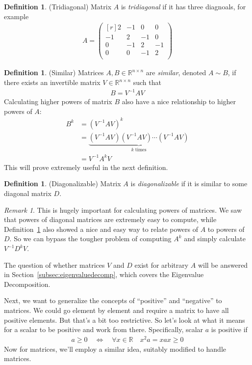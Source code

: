 \documentclass[12pt]{article}
\numberwithin{equation}{section} %
\theoremstyle{plain}
\theoremstyle{definition}
\newtheorem{defn}[thm]{Definition}
\theoremstyle{remark}
\newtheorem*{rmk}{Remark}
\newcommand{\R}{\mathbb{R}}
\newcommand{\Rnn}{\mathbb{R}^{n\times n}}
\begin{document}
\begin{defn}{(Tridiagonal)}
Matrix $A$ is \emph{tridiagonal} if it has three diagnoals, for example
\begin{align*}
  A =
  \begin{pmatrix}[r]
   2 & -1 &  0 &  0 \\
  -1 & 2 & -1 &  0 \\
   0 & -1 &  2 & -1 \\
   0 &  0 & -1 &  2 \\
  \end{pmatrix}
\end{align*}
\end{defn}

\begin{defn}{(Similar)}
\label{defn:similar}
Matrices $A,B \in \Rnn$ are \emph{similar}, denoted $A\sim B$, if there
exists an invertible matrix $V\in \Rnn$ such that
\begin{align*}
  B = V^{-1} A V
\end{align*}
Calculating higher powers of matrix $B$ also have a nice relationship to
higher powers of $A$:
\begin{align*}
  B^k &= \left(V^{-1} A V\right)^k \\
      &= \underbrace{\left(V^{-1} A V\right)\left(V^{-1} A V\right)
      \cdots  \left(V^{-1} A V\right)}_{k \;\text{times}} \\
      &= V^{-1} A^k V
\end{align*}
This will prove extremely useful in the next definition.
\end{defn}

\begin{defn}{(Diagonalizable)}
Matrix $A$ is \emph{diagonalizable} if it is similar to some diagonal
matrix $D$.
\end{defn}
\begin{rmk}
This is hugely important for calculating powers of matrices. We saw that
powers of diagonal matrices are extremely easy to compute, while
Definition~\ref{defn:similar} also showed a nice and easy way to relate
powers of $A$ to powers of $D$. So we can bypass the tougher problem of
computing $A^k$ and simply calculate $V^{-1} D^k V$.

The question of whether matrices $V$ and $D$ exist for arbitrary $A$
will be answered in Section~\ref{subsec:eigenvaluedecomp}, which covers
the Eigenvalue Decomposition.
\end{rmk}

Next, we want to generalize the concepts of ``positive'' and
``negative'' to matrices. We could go element by element and require a
matrix to have all positive elements. But that's a bit too restrictive.
So let's look at what it means for a scalar to be positive and work from
there. Specifically, scalar $a$ is positive if
\begin{align*}
  a \geq 0
  \quad\Leftrightarrow\quad
  \forall x\in \R
  \quad
  x^2 a = x a x\geq 0
\end{align*}
Now for matrices, we'll employ a similar idea, suitably modified to
handle matrices.
\end{document}
